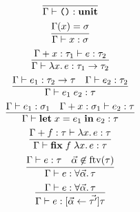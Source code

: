 \begin{gather*}
  \infer{\Gamma \vdash \text{\texttt{()}}: \mathbf{unit}}{}
  \\
  \infer{\Gamma \vdash x: \sigma}{
    \Gamma(x) = \sigma
  }
  \\
  \infer{\Gamma \vdash \lambda x\ldotp e: \tau_1 \to \tau_2}{
    \Gamma + x:\tau_1\vdash e: \tau_2
  }
  \\
  \infer{\Gamma \vdash e_1\; e_2: \tau}{
    \Gamma \vdash e_1: \tau_2 \to \tau
    &
    \Gamma \vdash e_2: \tau_2
  }
  \\
  \infer{\Gamma \vdash \mathbf{let}\; x = e_1\; \mathbf{in}\; e_2: \tau}{
    \Gamma \vdash e_1: \sigma_1
    &
    \Gamma + x: \sigma_1 \vdash e_2: \tau
  }
  \\
  \infer{\Gamma \vdash \mathbf{fix}\;f\;\lambda x\ldotp e: \tau}{
    \Gamma + f: \tau \vdash \lambda x\ldotp e: \tau
  }
  \\
  \infer{\Gamma \vdash e: \forall \vec{\alpha}\ldotp \tau}{
    \Gamma \vdash e: \tau
    &
    \vec{\alpha} \not\in \mathrm{ftv}(\tau)
  }
  \\
  \infer{\Gamma \vdash e: [\vec{\alpha} \assign \vec{\tau'}]\tau}{
    \Gamma \vdash e: \forall \vec{\alpha}\ldotp \tau
  }
\end{gather*}

